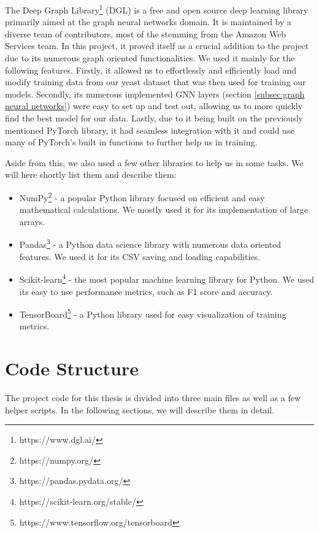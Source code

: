 \documentclass[times, utf8, diplomski, english]{fer_eng}
\begin{document}
The Deep Graph Library\footnote{https://www.dgl.ai/} (DGL) \cite{DGL} is a free and open source deep learning library primarily aimed at the graph neural networks domain. It is maintained by a diverse team of contributors, most of the stemming from the Amazon Web Services team. In this project, it proved itself as a crucial addition to the project due to its numerous graph oriented functionalities. We used it mainly for the following features. Firstly, it allowed us to effortlessly and efficiently load and modify training data from our yeast dataset that was then used for training our models. Secondly, its numerous implemented GNN layers (section \ref{subsec:graph neural networks}) were easy to set up and test out, allowing us to more quickly find the best model for our data. Lastly, due to it being built on the previously mentioned PyTorch library, it had seamless integration with it and could use many of PyTorch's built in functions to further help us in training.

Aside from this, we also used a few other libraries to help us in some tasks. We will here shortly list them and describe them:
\begin{itemize}
	\item NumPy\footnote{https://numpy.org/} - a popular Python library focused on efficient and easy mathematical calculations. We mostly used it for its implementation of large arrays.
	\item Pandas\footnote{https://pandas.pydata.org/} - a Python data science library with numerous data oriented features. We used it for its CSV saving and loading capabilities.
	\item Scikit-learn\footnote{https://scikit-learn.org/stable/} - the most popular machine learning library for Python. We used its easy to use performance metrics, such as F1 score and accuracy.
	\item TensorBoard\footnote{https://www.tensorflow.org/tensorboard} - a Python library used for easy visualization of training metrics.
\end{itemize}

\section{Code Structure}
\label{sec:code structure}

The project code for this thesis is divided into three main files as well as a few helper scripts. In the following sections, we will describe them in detail.
\end{document}

